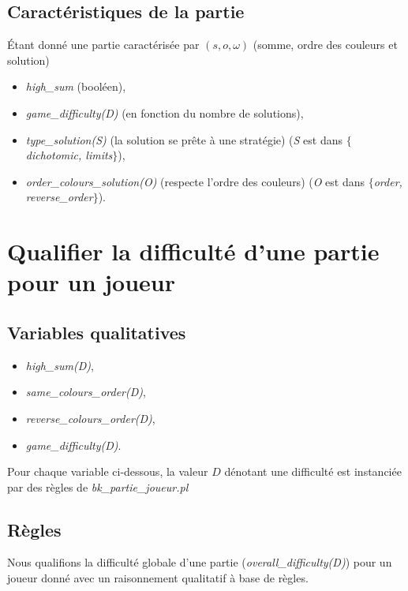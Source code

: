 \documentclass[a4paper, 12]{article}
\newcommand\acc[1]{$\{$\emph{#1}$\}$}
\begin{document}
\subsection{Caractéristiques de la partie}
Étant donné une partie caractérisée par $(s, o, \omega)$ (somme, ordre des couleurs et solution)

\begin{itemize}
	\item \emph{high\_sum} (booléen),
	\item \emph{game\_difficulty(D)} (en fonction du nombre de solutions),
	\item \emph{type\_solution(S)} (la solution se prête à une stratégie) (\emph{S} est dans \acc{dichotomic, limits}),
	\item \emph{order\_colours\_solution(O)} (respecte l’ordre des couleurs) (\emph{O} est dans \acc{order, reverse\_order}).
\end{itemize}


\section{Qualifier la difficulté d’une partie pour un joueur}

\subsection{Variables qualitatives}

\begin{itemize}
	\item \emph{high\_sum(D)},
	\item \emph{same\_colours\_order(D)},
	\item \emph{reverse\_colours\_order(D)},
	\item \emph{game\_difficulty(D)}.
\end{itemize}

Pour chaque variable ci-dessous, la valeur $D$ dénotant une difficulté est instanciée par des règles de \emph{bk\_partie\_joueur.pl}

\subsection{Règles}
Nous qualifions la difficulté globale d’une partie (\emph{overall\_difficulty(D)}) pour un joueur donné avec un raisonnement qualitatif à base de règles.
\end{document}
